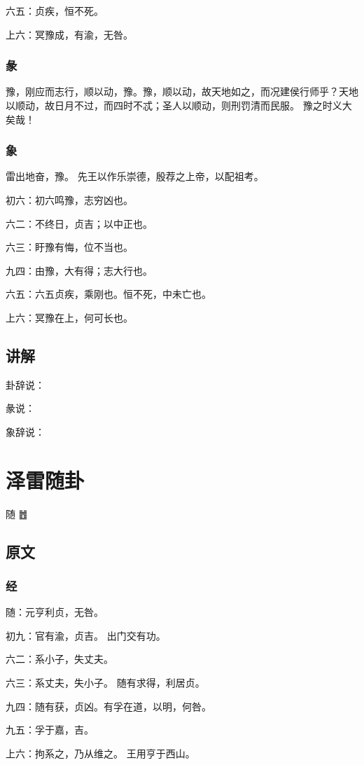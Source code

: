 \documentclass[12pt,oneside]{book}
\begin{document}
六五：贞疾，恒不死。

上六：冥豫成，有渝，无咎。

\subsection{彖}
豫，刚应而志行，顺以动，豫。豫，顺以动，故天地如之，而况建侯行师乎？天地以顺动，故日月不过，而四时不忒；圣人以顺动，则刑罚清而民服。 豫之时义大矣哉！

\subsection{象}
雷出地奋，豫。 先王以作乐崇德，殷荐之上帝，以配祖考。

初六：初六鸣豫，志穷凶也。

六二：不终日，贞吉；以中正也。

六三：盱豫有悔，位不当也。

九四：由豫，大有得；志大行也。

六五：六五贞疾，乘刚也。恒不死，中未亡也。

上六：冥豫在上，何可长也。

\section{讲解}
卦辞说：

彖说：

象辞说：


\chapter{泽雷随卦}
随 {\Large ䷐}

\section{原文}

\subsection{经}
随：元亨利贞，无咎。

初九：官有渝，贞吉。 出门交有功。

六二：系小子，失丈夫。

六三：系丈夫，失小子。 随有求得，利居贞。

九四：随有获，贞凶。有孚在道，以明，何咎。

九五：孚于嘉，吉。

上六：拘系之，乃从维之。 王用亨于西山。
\end{document}
